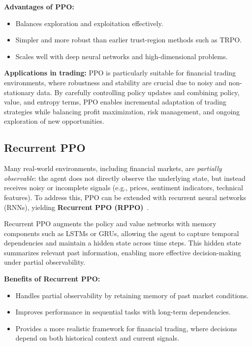 \documentclass[12pt,a4paper]{report}
\begin{document}
\textbf{Advantages of PPO:}
\begin{itemize}
    \item Balances exploration and exploitation effectively.
    \item Simpler and more robust than earlier trust-region methods such as TRPO.
    \item Scales well with deep neural networks and high-dimensional problems.
\end{itemize}

\textbf{Applications in trading:}  
PPO is particularly suitable for financial trading environments, where robustness and stability are crucial due to noisy and non-stationary data. By carefully controlling policy updates and combining policy, value, and entropy terms, PPO enables incremental adaptation of trading strategies while balancing profit maximization, risk management, and ongoing exploration of new opportunities.

\subsection{Recurrent PPO}

Many real-world environments, including financial markets, are \textit{partially observable}: the agent does not directly observe the underlying state, but instead receives noisy or incomplete signals (e.g., prices, sentiment indicators, technical features). To address this, PPO can be extended with recurrent neural networks (RNNs), yielding \textbf{Recurrent PPO (RPPO)}~\cite{heess2015memory}.

Recurrent PPO augments the policy and value networks with memory components such as LSTMs or GRUs, allowing the agent to capture temporal dependencies and maintain a hidden state across time steps. This hidden state summarizes relevant past information, enabling more effective decision-making under partial observability.

\textbf{Benefits of Recurrent PPO:}
\begin{itemize}
    \item Handles partial observability by retaining memory of past market conditions.
    \item Improves performance in sequential tasks with long-term dependencies.
    \item Provides a more realistic framework for financial trading, where decisions depend on both historical context and current signals.
\end{itemize}
\end{document}
